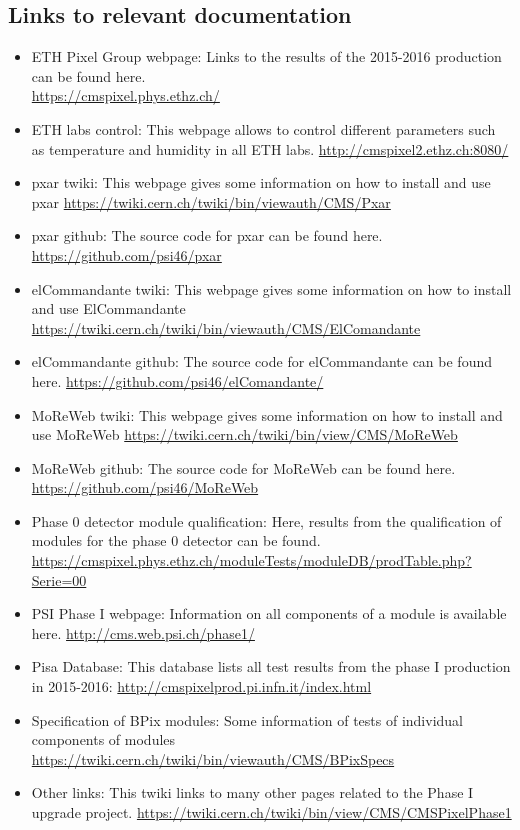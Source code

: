 \documentclass[a4paper,12pt,twoside]{article}
\begin{document}
\begin{appendices}
\section{Links to relevant documentation}  \label{Links}
\begin{itemize}
\item ETH Pixel Group webpage: Links to the results of the 2015-2016 production can be found here. \\
\url{https://cmspixel.phys.ethz.ch/}
\item ETH labs control: This webpage allows to control different parameters such as temperature and humidity in all ETH labs.
\url{http://cmspixel2.ethz.ch:8080/}
\item pxar twiki: This webpage gives some information on how to install and use pxar
\url{https://twiki.cern.ch/twiki/bin/viewauth/CMS/Pxar}
\item pxar github: The source code for pxar can be found here.
\url{https://github.com/psi46/pxar}
\item elCommandante twiki: This webpage gives some information on how to install and use ElCommandante
\url{https://twiki.cern.ch/twiki/bin/viewauth/CMS/ElComandante}
\item elCommandante github: The source code for elCommandante can be found here.
\url{https://github.com/psi46/elComandante/}
\item MoReWeb twiki: This webpage gives some information on how to install and use MoReWeb
\url{https://twiki.cern.ch/twiki/bin/view/CMS/MoReWeb}
\item MoReWeb github: The source code for MoReWeb can be found here.
\url{https://github.com/psi46/MoReWeb}
\item Phase 0 detector module qualification: Here, results from the qualification of modules for the phase 0 detector can be found.
\url{https://cmspixel.phys.ethz.ch/moduleTests/moduleDB/prodTable.php?Serie=00}
\item PSI Phase I webpage: Information on all components of a module is available here.
\url{http://cms.web.psi.ch/phase1/}
\item Pisa Database: This database lists all test results from the phase I production in 2015-2016:
\url{http://cmspixelprod.pi.infn.it/index.html}
\item Specification of BPix modules: Some information of tests of individual components of modules 
\url{https://twiki.cern.ch/twiki/bin/viewauth/CMS/BPixSpecs}
\item Other links: This twiki links to many other pages related to the Phase I upgrade project.
\url{https://twiki.cern.ch/twiki/bin/view/CMS/CMSPixelPhase1}

\end{itemize}

\end{appendices}
\end{document}
